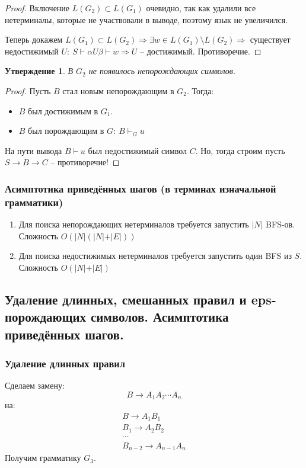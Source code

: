 \documentclass[a4paper,12pt]{article}
\theoremstyle{plain}
\newtheorem{proposition}{Утверждение}[subsection]
\theoremstyle{definition}
\theoremstyle{remark}
\begin{document}
\begin{proof}
	Включение $L(G_2) \subset L(G_1)$ очевидно, так как удалили все нетерминалы, которые не участвовали в выводе, поэтому язык не увеличился.

	Теперь докажем $L(G_1) \subset L(G_2) \Rightarrow \exists w \in L(G_1) \setminus L(G_2) \Rightarrow$ существует недостижимый $U :\: S \vdash \alpha U \beta \vdash w \Rightarrow U$ -- достижимый. Противоречие.
\end{proof}

\begin{proposition}
	В $G_2$ не появилось непорождающих символов.
\end{proposition}

\begin{proof}
	Пусть $B$ стал новым непорождающим в $G_2$. Тогда:
	\begin{itemize}
		\item $B$ был достижимым в $G_1$.
		\item $B$ был порождающим в $G :\: B \vdash_G u$
	\end{itemize}
	На пути вывода $B \vdash u$ был недостижимый символ $C$. Но, тогда строим пусть $S \to B \to C$ -- противоречие!
\end{proof}

\subsubsection*{Асимптотика приведённых шагов (в терминах изначальной грамматики)}
\begin{enumerate}
	\item Для поиска непорождающих нетерминалов требуется запустить $\vert N \vert$ BFS-ов. Сложность $O(\vert N \vert (\vert N\vert + \vert E \vert))$
	\item Для поиска недостижимых нетерминалов требуется запустить один BFS из $S$. Сложность $O(\vert N\vert + \vert E \vert)$
\end{enumerate}

\subsection{Удаление длинных, смешанных правил и eps-порождающих символов. Асимптотика приведённых шагов.}
\subsubsection*{Удаление длинных правил}
Сделаем замену:
\[
	B \to A_1A_2\cdots A_n
\]
на:
\begin{align*}
	B \to A_1B_1   \\
	B_1 \to A_2B_2 \\
	\cdots         \\
	B_{n - 2} \to A_{n - 1}A_n
\end{align*}
Получим грамматику $G_3$.
\end{document}
